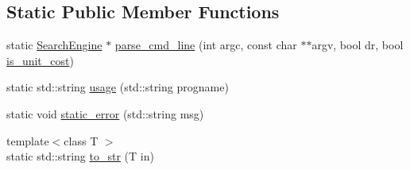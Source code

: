 \subsection*{Static Public Member Functions}
\begin{DoxyCompactItemize}
\item 
static \hyperlink{classSearchEngine}{Search\-Engine} $\ast$ \hyperlink{classOptionParser_a408b7787a319398b0b9a0feeda126caf}{parse\-\_\-cmd\-\_\-line} (int argc, const char $\ast$$\ast$argv, bool dr, bool \hyperlink{task__tools_8h_a1053b6dfc4fc969dfd784c8d07c1d05a}{is\-\_\-unit\-\_\-cost})
\item 
static std\-::string \hyperlink{classOptionParser_a0ff324cd8d3117adf9f568be5bb730a0}{usage} (std\-::string progname)
\item 
static void \hyperlink{classOptionParser_ad55b24f8e075c11c1626260f4d55a53e}{static\-\_\-error} (std\-::string msg)
\item 
{\footnotesize template$<$class T $>$ }\\static std\-::string \hyperlink{classOptionParser_a38e7aa5a5356e0e2e6f5c2381c0d7fe1}{to\-\_\-str} (T in)
\end{DoxyCompactItemize}


